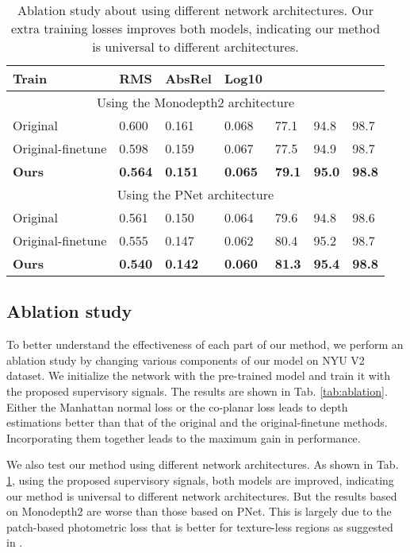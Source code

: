 \documentclass[10pt,twocolumn,letterpaper]{article}
\newcommand{\Tab}[1]{Tab. \ref{#1}}
\begin{document}
\begin{table}
\scriptsize
	\centering
	\begin{tabularx}{0.48\textwidth}{|l|XXX|XXX|}
		\hline
		Train & RMS & AbsRel & Log10  &  &  &  \\
		\hline
		\hline
		\multicolumn{7}{|c|}{Using the Monodepth2 \cite{godard2019digging} architecture} \\
		\hline
		Original & 0.600 & 0.161 & 0.068 & 77.1 & 94.8  & 98.7 \\
		Original-finetune & 0.598 & 0.159 & 0.067 & 77.5 & 94.9  & 98.7 \\
		\textbf{Ours}  & \textbf{0.564}  & \textbf{0.151} & \textbf{0.065} & \textbf{79.1}  & \textbf{95.0}  & \textbf{98.8} \\
		\hline
		\hline
		\multicolumn{7}{|c|}{Using the PNet \cite{yu2020p} architecture} \\
		\hline
		Original & 0.561 & 0.150 & 0.064 & 79.6  & 94.8  & 98.6 \\
		Original-finetune & 0.555 & 0.147  & 0.062 & 80.4  & 95.2  & 98.7 \\
\textbf{Ours}  & \textbf{0.540} & \textbf{0.142} & 
		\textbf{0.060} & \textbf{81.3}  & \textbf{95.4}  & \textbf{98.8} \\
		\hline
	\end{tabularx}
	\newline
	\caption{Ablation study about using different network architectures. Our extra training losses improves both models, indicating our method is universal to different architectures. }
	\label{tab:diff baseline}  
\end{table} 

\subsection{Ablation study}
To better understand the effectiveness of each part of our method, we perform an ablation study by changing various components of our model on NYU V2 dataset. We initialize the network with the pre-trained model \cite{yu2020p} and train it with the proposed supervisory signals. The results are shown in \Tab{tab:ablation}. Either the Manhattan normal loss or the co-planar loss leads to depth estimations better than that of the original and the original-finetune methods. 
Incorporating them together leads to the maximum gain in performance.

We also test our method using different network architectures. As shown in \Tab{tab:diff baseline}, using the proposed supervisory signals, both models are improved, indicating our method is universal to different network architectures. But the results based on Monodepth2 are worse than those based on PNet. This is largely due to the patch-based photometric loss that is better for texture-less regions as suggested in \cite{yu2020p}.
\end{document}
